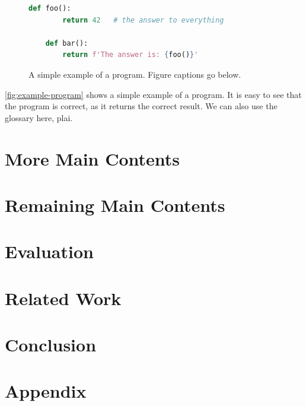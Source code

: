 \documentclass[thesis]{plai}
\begin{document}
\begin{figure}[t]
    \begin{lstlisting}[language=Python, gobble=4]
    def foo():
        return 42   # the answer to everything

    def bar():
        return f'The answer is: {foo()}'
    \end{lstlisting}
    \caption{A simple example of a program. Figure captions go below.}
    \label{fig:example-program}
\end{figure}

\autoref{fig:example-program} shows a simple example of a program.
It is easy to see that the program is correct, as it returns the correct result.
We can also use the glossary here, \gls{plai}.

\chapter{More Main Contents}
\label{sec:transfer}

\lipsum[2-3]


\chapter{Remaining Main Contents}
\label{sec:remaining}

\lipsum[2-3]

\chapter{Evaluation}
\label{sec:evaluation}



\chapter{Related Work}
\label{sec:related-work}



\chapter{Conclusion}
\label{sec:conclusion}






\chapter*{Appendix}
\label{sec:appendix}



\listoffigures{}
\listoftables{}

\printglossaries
\end{document}
